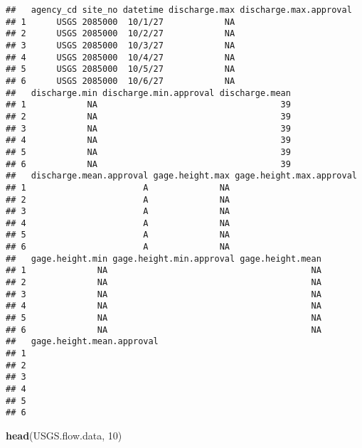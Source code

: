 \documentclass[]{article}
\newenvironment{Shaded}{\begin{snugshade}}{\end{snugshade}}
\newcommand{\DecValTok}[1]{\textcolor[rgb]{0.00,0.00,0.81}{#1}}
\newcommand{\KeywordTok}[1]{\textcolor[rgb]{0.13,0.29,0.53}{\textbf{#1}}}
\newcommand{\NormalTok}[1]{#1}
\begin{document}
\begin{verbatim}
##   agency_cd site_no datetime discharge.max discharge.max.approval
## 1      USGS 2085000  10/1/27            NA                       
## 2      USGS 2085000  10/2/27            NA                       
## 3      USGS 2085000  10/3/27            NA                       
## 4      USGS 2085000  10/4/27            NA                       
## 5      USGS 2085000  10/5/27            NA                       
## 6      USGS 2085000  10/6/27            NA                       
##   discharge.min discharge.min.approval discharge.mean
## 1            NA                                    39
## 2            NA                                    39
## 3            NA                                    39
## 4            NA                                    39
## 5            NA                                    39
## 6            NA                                    39
##   discharge.mean.approval gage.height.max gage.height.max.approval
## 1                       A              NA                         
## 2                       A              NA                         
## 3                       A              NA                         
## 4                       A              NA                         
## 5                       A              NA                         
## 6                       A              NA                         
##   gage.height.min gage.height.min.approval gage.height.mean
## 1              NA                                        NA
## 2              NA                                        NA
## 3              NA                                        NA
## 4              NA                                        NA
## 5              NA                                        NA
## 6              NA                                        NA
##   gage.height.mean.approval
## 1                          
## 2                          
## 3                          
## 4                          
## 5                          
## 6
\end{verbatim}

\begin{Shaded}
\begin{Highlighting}[]
\KeywordTok{head}\NormalTok{(USGS.flow.data, }\DecValTok{10}\NormalTok{)}
\end{Highlighting}
\end{Shaded}
\end{document}
